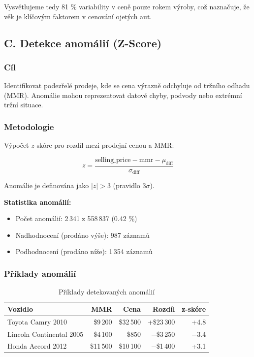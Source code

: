 \documentclass[12pt,a4paper]{article}
\begin{document}
Vysvětlujeme tedy 81 \% variability v ceně pouze rokem výroby, což naznačuje,
že věk je klíčovým faktorem v cenování ojetých aut.

\subsection{C. Detekce anomálií (Z-Score)}

\subsubsection{Cíl}

Identifikovat podezřelé prodeje, kde se cena výrazně odchyluje od tržního odhadu (MMR).
Anomálie mohou reprezentovat datové chyby, podvody nebo extrémní tržní situace.

\subsubsection{Metodologie}

Výpočet $z$-skóre pro rozdíl mezi prodejní cenou a MMR:

$$z = \frac{\text{selling\_price} - \text{mmr} - \mu_{\text{diff}}}{\sigma_{\text{diff}}}$$

Anomálie je definována jako $|z| > 3$ (pravidlo $3\sigma$).

\textbf{Statistika anomálií:}
\begin{itemize}
    \item Počet anomálií: 2\,341 z 558\,837 (0.42 \%)
    \item Nadhodnocení (prodáno výše): 987 záznamů
    \item Podhodnocení (prodáno níže): 1\,354 záznamů
\end{itemize}

\subsubsection{Příklady anomálií}

\begin{table}[H]
    \centering
    \small
    \caption{Příklady detekovaných anomálií}
    \begin{tabular}{|l|r|r|r|r|}
        \hline
        \textbf{Vozidlo} & \textbf{MMR} & \textbf{Cena} & \textbf{Rozdíl} & \textbf{z-skóre} \\
        \hline
        Toyota Camry 2010 & \$9\,200 & \$32\,500 & +\$23\,300 & +4.8 \\
        Lincoln Continental 2005 & \$4\,100 & \$850 & −\$3\,250 & −3.4 \\
        Honda Accord 2012 & \$11\,500 & \$10\,100 & −\$1\,400 & +3.1 \\
        \hline
    \end{tabular}
\end{table}
\end{document}

